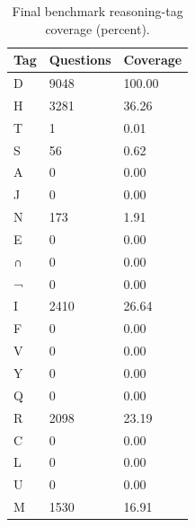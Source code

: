 \begin{table}[t]
\centering
\small
\begin{tabular}{lll}
\toprule
Tag & Questions & Coverage \\
\midrule
D & 9048 & 100.00 \\
H & 3281 & 36.26 \\
T & 1 & 0.01 \\
S & 56 & 0.62 \\
A & 0 & 0.00 \\
J & 0 & 0.00 \\
N & 173 & 1.91 \\
E & 0 & 0.00 \\
∩ & 0 & 0.00 \\
¬ & 0 & 0.00 \\
I & 2410 & 26.64 \\
F & 0 & 0.00 \\
V & 0 & 0.00 \\
Y & 0 & 0.00 \\
Q & 0 & 0.00 \\
R & 2098 & 23.19 \\
C & 0 & 0.00 \\
L & 0 & 0.00 \\
U & 0 & 0.00 \\
M & 1530 & 16.91 \\
\bottomrule
\end{tabular}
\caption{Final benchmark reasoning-tag coverage (percent).}
\label{tab:core-v11-tags}
\end{table}
